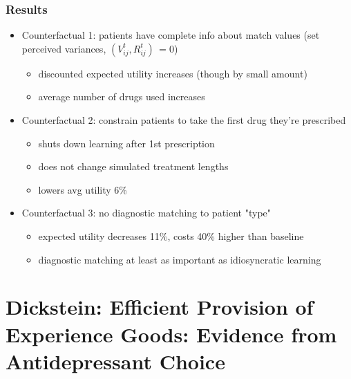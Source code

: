 \begin{frame}
\frametitle{Results}

\begin{itemize}
\item Counterfactual 1: patients have complete info about match values (set
perceived variances, $(V_{ij}^{t},R_{ij}^{t})\,=0$)

\begin{itemize}
\item discounted expected utility increases (though by small amount)

\item average number of drugs used increases
\end{itemize}

\item Counterfactual 2: constrain patients to take the first drug they're
prescribed

\begin{itemize}
\item shuts down learning after 1st prescription

\item does not change simulated treatment lengths

\item lowers avg utility 6\%
\end{itemize}

\item Counterfactual 3: no diagnostic matching to patient "type"

\begin{itemize}
\item expected utility decreases 11\%, costs 40\% higher than baseline

\item diagnostic matching at least as important as idiosyncratic learning
\end{itemize}
\end{itemize}
\end{frame}




\section{Dickstein: Efficient Provision of Experience Goods: Evidence from
Antidepressant Choice}


